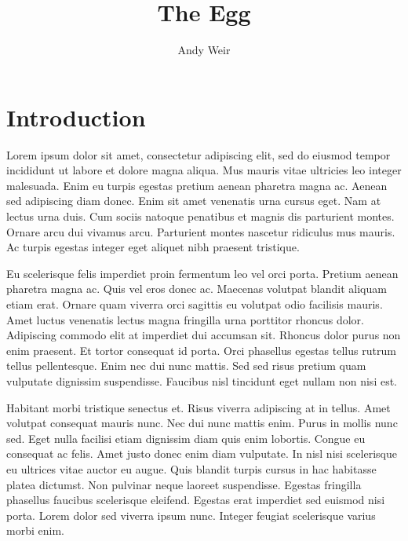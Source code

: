 \documentclass{article}
\title{The Egg}
\author{Andy Weir}
\date{}
\begin{document}
\maketitle

\section{Introduction}

Lorem ipsum dolor sit amet, consectetur adipiscing elit, sed do eiusmod tempor incididunt ut labore et dolore magna aliqua. Mus mauris vitae ultricies leo integer malesuada. Enim eu turpis egestas pretium aenean pharetra magna ac. Aenean sed adipiscing diam donec. Enim sit amet venenatis urna cursus eget. Nam at lectus urna duis. Cum sociis natoque penatibus et magnis dis parturient montes. Ornare arcu dui vivamus arcu. Parturient montes nascetur ridiculus mus mauris. Ac turpis egestas integer eget aliquet nibh praesent tristique.

Eu scelerisque felis imperdiet proin fermentum leo vel orci porta. Pretium aenean pharetra magna ac. Quis vel eros donec ac. Maecenas volutpat blandit aliquam etiam erat. Ornare quam viverra orci sagittis eu volutpat odio facilisis mauris. Amet luctus venenatis lectus magna fringilla urna porttitor rhoncus dolor. Adipiscing commodo elit at imperdiet dui accumsan sit. Rhoncus dolor purus non enim praesent. Et tortor consequat id porta. Orci phasellus egestas tellus rutrum tellus pellentesque. Enim nec dui nunc mattis. Sed sed risus pretium quam vulputate dignissim suspendisse. Faucibus nisl tincidunt eget nullam non nisi est.

Habitant morbi tristique senectus et. Risus viverra adipiscing at in tellus. Amet volutpat consequat mauris nunc. Nec dui nunc mattis enim. Purus in mollis nunc sed. Eget nulla facilisi etiam dignissim diam quis enim lobortis. Congue eu consequat ac felis. Amet justo donec enim diam vulputate. In nisl nisi scelerisque eu ultrices vitae auctor eu augue. Quis blandit turpis cursus in hac habitasse platea dictumst. Non pulvinar neque laoreet suspendisse. Egestas fringilla phasellus faucibus scelerisque eleifend. Egestas erat imperdiet sed euismod nisi porta. Lorem dolor sed viverra ipsum nunc. Integer feugiat scelerisque varius morbi enim.
\end{document}
